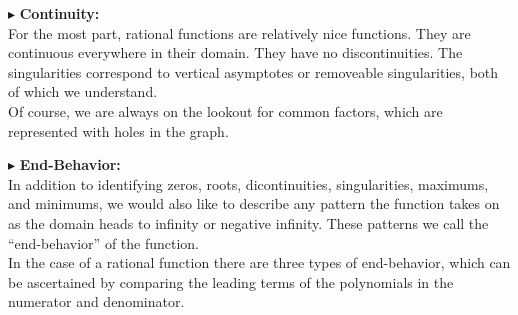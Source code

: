 \documentclass{ximera}
\begin{document}
$\blacktriangleright$ \textbf{\textcolor{red!10!blue!90!}{Continuity:}} \\
For the most part, rational functions are relatively nice functions.  They are continuous everywhere in their domain.  They have no discontinuities.  The singularities correspond to vertical asymptotes or removeable singularities, both of which we understand.  \\

Of course, we are always on the lookout for common factors, which are represented with holes in the graph.








$\blacktriangleright$ \textbf{\textcolor{red!10!blue!90!}{End-Behavior:}} \\
In addition to identifying zeros, roots, dicontinuities, singularities, maximums, and minimums, we would also like to describe any pattern the function takes on as the domain heads to infinity or negative infinity.  These patterns we call the ``end-behavior'' of the function.  \\

In the case of a rational function there are three types of end-behavior, which can be ascertained by comparing the leading terms of the polynomials in the numerator and denominator.
\end{document}

